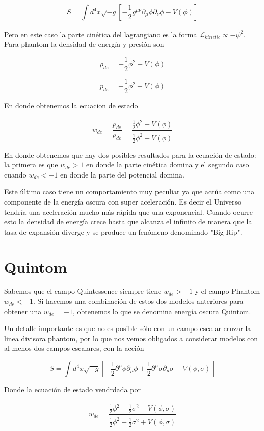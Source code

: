 \documentclass{article}
\begin{document}
\begin{equation}
S=\int d^{4} x \sqrt{-g} [-\frac{1}{2} g^{\mu \nu} \partial_{\mu}\phi \partial_{\nu}\phi - V(\phi)]
\end{equation}

Pero en este caso la parte cin\'etica del lagrangiano es la forma $\mathcal{L}_{kinetic} \propto -\dot{\psi^{2}}$. 
Para phantom la densidad de energ\'ia y presi\'on son

\begin{equation}
\rho_{de} =- \frac{1}{2} \dot{\phi^{2}} + V(\phi)
\end{equation}

\begin{equation}
p_{de} =- \frac{1}{2} \dot{\phi^{2}} - V(\phi)
\end{equation}

En donde obtenemos la ecuacion de estado

\begin{equation}
w_{de}=\frac{p_{de}}{\rho_{de}}=\frac{\frac{1}{2} \dot{\phi^{2}} + V(\phi)}{\frac{1}{2} \dot{\phi^{2}} - V(\phi)}
\end{equation}

En donde obtenemos que hay dos posibles resultados para la ecuaci\'on de estado: la primera es que $w_{de} > 1$ en donde la parte cin\'etica domina y el segundo caso cuando $w_{de} < -1$ en donde la parte del potencial domina.

Este \'ultimo caso tiene un comportamiento muy peculiar ya que act\'ua como una componente de la energ\'ia oscura con super aceleraci\'on. Es decir el Universo tendr\'ia una aceleraci\'on mucho m\'as r\'apida que una exponencial. Cuando ocurre esto la densidad de energ\'ia crece hasta que alcanza el infinito de manera que la tasa de expansi\'on diverge y se produce un fen\'omeno denominado "Big Rip".


\section{Quintom}
Sabemos que el campo Quintessence siempre tiene $w_{de} > -1$ y el campo Phantom $w_{de} < -1$. Si hacemos una combinaci\'on de estos dos modelos anteriores para obtener una $w_{de}=-1$, obtenemos lo que se denomina energ\'ia oscura Quintom.

Un detalle importante es que no es posible s\'olo con un campo escalar  cruzar la linea divisora phantom, por lo que nos vemos obligados a considerar modelos con al menos dos campos escalares, con la acci\'on

\begin{equation}
S=\int d^{4} x \sqrt{-g} [-\frac{1}{2} \partial^{\mu}\phi \partial_{\mu}\phi + \frac{1}{2} \partial ^{\mu} \sigma \partial_{\mu} \sigma - V(\phi,\sigma)]
\end{equation}

Donde la ecuaci\'on de estado vendr\a dada por

\begin{equation}
w_{de}=\frac{\frac{1}{2} \dot{\phi^{2}} - \frac{1}{2} \dot{\sigma^{2}} - V(\phi,\sigma)} {\frac{1}{2} \dot{\phi^{2}} - \frac{1}{2} \dot{\sigma^{2}} + V(\phi,\sigma)}
\end{equation}
\end{document}
